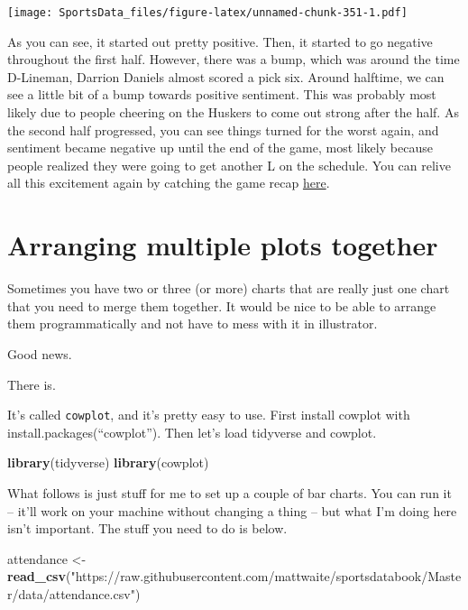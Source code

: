 \documentclass[
]{book}
\newenvironment{Shaded}{\begin{snugshade}}{\end{snugshade}}
\newcommand{\KeywordTok}[1]{\textcolor[rgb]{0.13,0.29,0.53}{\textbf{#1}}}
\newcommand{\NormalTok}[1]{#1}
\newcommand{\StringTok}[1]{\textcolor[rgb]{0.31,0.60,0.02}{#1}}
\begin{document}
\texttt{[image: SportsData\_files/figure-latex/unnamed-chunk-351-1.pdf]}

As you can see, it started out pretty positive. Then, it started to go negative throughout the first half. However, there was a bump, which was around the time D-Lineman, Darrion Daniels almost scored a pick six. Around halftime, we can see a little bit of a bump towards positive sentiment. This was probably most likely due to people cheering on the Huskers to come out strong after the half. As the second half progressed, you can see things turned for the worst again, and sentiment became negative up until the end of the game, most likely because people realized they were going to get another L on the schedule. You can relive all this excitement again by catching the game recap \href{https://www.youtube.com/watch?v=m0hKH6Zb0vY\&feature=onebox}{here}.

\hypertarget{arranging-multiple-plots-together}{%
\chapter{Arranging multiple plots together}\label{arranging-multiple-plots-together}}

Sometimes you have two or three (or more) charts that are really just one chart that you need to merge them together. It would be nice to be able to arrange them programmatically and not have to mess with it in illustrator.

Good news.

There is.

It's called \texttt{cowplot}, and it's pretty easy to use. First install cowplot with install.packages(``cowplot''). Then let's load tidyverse and cowplot.

\begin{Shaded}
\begin{Highlighting}[]
\KeywordTok{library}\NormalTok{(tidyverse)}
\KeywordTok{library}\NormalTok{(cowplot)}
\end{Highlighting}
\end{Shaded}

What follows is just stuff for me to set up a couple of bar charts. You can run it -- it'll work on your machine without changing a thing -- but what I'm doing here isn't important. The stuff you need to do is below.

\begin{Shaded}
\begin{Highlighting}[]
\NormalTok{attendance <-}\StringTok{ }\KeywordTok{read_csv}\NormalTok{(}\StringTok{"https://raw.githubusercontent.com/mattwaite/sportsdatabook/Master/data/attendance.csv"}\NormalTok{)}
\end{Highlighting}
\end{Shaded}
\end{document}
